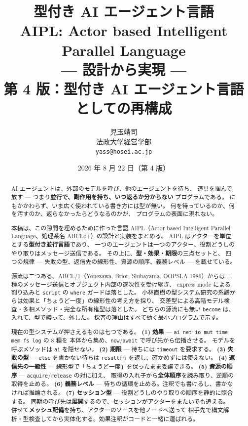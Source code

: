 \documentclass[11pt,a4paper]{ltjsarticle}
\title{\bfseries 型付き AI エージェント言語\\[1.5mm]
       \bfseries AIPL: Actor based Intelligent Parallel Language\\[2mm]
       \large --- 設計から実現 ---\\[1mm]
       \normalsize 第 4 版：型付き AI エージェント言語としての再構成}
\author{児玉靖司\\\small 法政大学経営学部\\\small \texttt{yass@hosei.ac.jp}}
\date{2026 年 8 月 22 日（第 4 版）}
\theoremstyle{definition}
\theoremstyle{remark}
\begin{document}
\maketitle

\begin{abstract}
AI エージェントは、外部のモデルを呼び、他のエージェントを待ち、
道具を掴んで放す --- つまり\textbf{並行で、副作用を持ち、いつ返るか分からない}
プログラムである。
にもかかわらず、いま広く使われている書き方には型が無い。
何を待っているのか、何を汚すのか、返らなかったらどうなるのかが、
プログラムの表面に現れない。

本稿は、この隙間を埋めるために作った言語 AIPL（Actor based Intelligent
Parallel Language、処理系名 ABCLc+）の設計と実装をまとめる。
AIPL はアクターを単位とする\textbf{型付き並行言語}であり、
一つのエージェントは一つのアクター、役割どうしのやり取りはメッセージ送信である。
その上に、\textbf{型・効果・期限}の三点セットと、
四つの規律 --- 失敗の型、返信先の線形性、資源の順序、義務レベル --- を載せている。

源流は二つある。ABCL/1（Yonezawa, Briot, Shibayama, OOPSLA 1986）からは
三種のメッセージ送信とオブジェクト内部の逐次性を受け継ぎ、
express mode による割り込みと \texttt{script} の \texttt{where} ガードは落とした。
小林直樹の型システム研究の系譜からは効果と「ちょうど一度」の線形性の考え方を採り、
交差型による高階モデル検査・多相メソッド・完全な所有権型は落とした。
どちらの源流にも無い \texttt{become} は、入れて、型で縛って、外した。
採否の理由はすべて動く最小プログラムで示す。

現在の型システムが押さえるものは七つである。
\textbf{(1)} \textbf{効果} --- \texttt{ai net io mut time mem fs log} の 8 種を
本体から集め、\texttt{now}/\texttt{await} で呼び先から伝播させる。
モデルを呼ぶメソッドは \texttt{ai} を隠せない。
\textbf{(2)} \textbf{期限} --- 待ちには \texttt{timeout} を要求する。
\textbf{(3)} \textbf{失敗の型} --- \texttt{else} を書かない待ちは
\texttt{result}$\langle\tau\rangle$ を返し、確かめずには使えない。
\textbf{(4)} \textbf{返信先の一級性} --- 線形型で「ちょうど一度」を保ったまま委譲できる。
\textbf{(5)} \textbf{資源の順序} --- \texttt{acquire}/\texttt{release} の対に加え、
取得の入れ子から\textbf{全体順序}を読み取り、逆順の取得を止める。
\textbf{(6)} \textbf{義務レベル} --- 待ちの循環を止める。注釈でも書けるし、書かなければ推論される。
\textbf{(7)} \textbf{セッション型} --- 役割どうしのやり取りの順序を静的に照合する。
同期の呼び先は\textbf{展開}するので、セッションがアクターをまたいでも追える。
併せて\textbf{メッシュ配備}を持ち、アクターのソースを他ノードへ送って
相手先で構文解析・型検査してから実体化する。効果注釈がコードと一緒に運ばれる。


\end{abstract}
\end{document}
